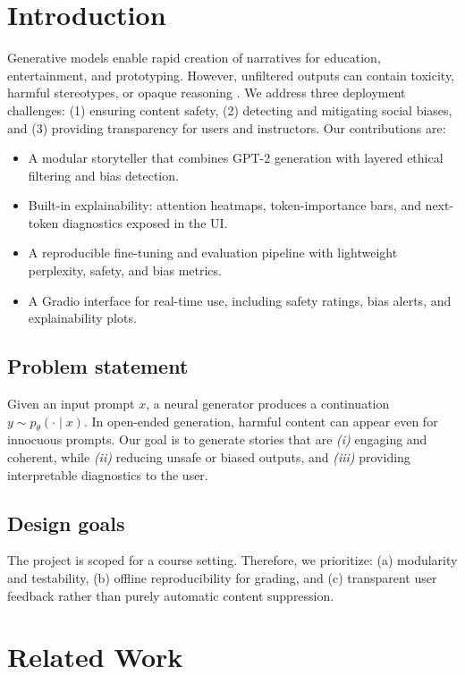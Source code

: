 \documentclass[conference]{IEEEtran}
\begin{document}
\section{Introduction}
Generative models enable rapid creation of narratives for education, entertainment, and prototyping. However, unfiltered outputs can contain toxicity, harmful stereotypes, or opaque reasoning \cite{bender2021parrots}. We address three deployment challenges: (1) ensuring content safety, (2) detecting and mitigating social biases, and (3) providing transparency for users and instructors. Our contributions are:
\begin{itemize}
    \item A modular storyteller that combines GPT-2 generation with layered ethical filtering and bias detection.
    \item Built-in explainability: attention heatmaps, token-importance bars, and next-token diagnostics exposed in the UI.
    \item A reproducible fine-tuning and evaluation pipeline with lightweight perplexity, safety, and bias metrics.
    \item A Gradio interface for real-time use, including safety ratings, bias alerts, and explainability plots.
\end{itemize}

\subsection{Problem statement}
Given an input prompt \(x\), a neural generator produces a continuation \(y\sim p_\theta(\cdot \mid x)\). In open-ended generation, harmful content can appear even for innocuous prompts. Our goal is to generate stories that are \textit{(i)} engaging and coherent, while \textit{(ii)} reducing unsafe or biased outputs, and \textit{(iii)} providing interpretable diagnostics to the user.

\subsection{Design goals}
The project is scoped for a course setting. Therefore, we prioritize: (a) modularity and testability, (b) offline reproducibility for grading, and (c) transparent user feedback rather than purely automatic content suppression.

\section{Related Work}
\end{document}
